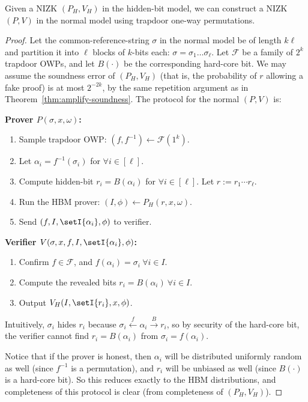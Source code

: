 \begin{theorem}\label{thm:NIZK-amplify}
    Given a NIZK $(P_H, V_H)$ in the hidden-bit model, we can construct a NIZK
    $(P, V)$ in the normal model using trapdoor one-way permutations.
\end{theorem}
\begin{proof}
    Let the common-reference-string $\sigma$ in the normal model be of length $k\ell$ and  partition it
    into $\ell$ blocks of $k$-bits each: $\sigma = \sigma_1\hdots\sigma_\ell$.
    Let $\mathcal{F}$ be a family of $2^k$ trapdoor OWPs, and let $B(\cdot)$
    be the corresponding hard-core bit. We may assume the soundness error
    of $(P_H, V_H)$
    (that is, the probability of $r$ allowing a fake proof)
    is at most $2^{-2k}$, by the same repetition argument as in Theorem~\ref{thm:amplify-soundness}.
    The protocol for the normal $(P, V)$ is:

\medskip
\noindent \textbf{Prover $P(\sigma, x, \omega)$:}
\begin{enumerate}
    \item Sample trapdoor OWP: $(f, f^{-1}) \gets \mathcal{F}(1^k)$.
    \item Let $\alpha_i = f^{-1}(\sigma_i)$ for $\forall i \in [\ell]$.
    \item Compute hidden-bit $r_i = B(\alpha_i)$ for $\forall i \in [\ell]$. Let $r := r_1 \cdots r_\ell$.
    \item Run the HBM prover: $(I, \phi) \gets P_H(r, x, \omega)$.
    \item Send $(f, I, \setI{\alpha_i}, \phi)$ to verifier.
\end{enumerate}

\noindent \textbf{Verifier $V(\sigma, x, f, I, \setI{\alpha_i}, \phi)$:}
\begin{enumerate}
    \item Confirm $f \in \mathcal{F}$, and $f(\alpha_i) = \sigma_i ~\forall i \in I$.
    \item Compute the revealed bits $r_i = B(\alpha_i) ~\forall i \in I$.
    \item Output $V_H(I, \setI{r_i}, x, \phi)$.
\end{enumerate}

Intuitively, $\sigma_i$ hides $r_i$ because $\sigma_i \overset{f}{\gets} \alpha_i
\overset{B}{\to} r_i$, so by security of the hard-core bit, the verifier cannot
find $r_i = B(\alpha_i)$ from $\sigma_i = f(\alpha_i)$.

Notice that if the prover is honest, then $\alpha_i$ will be distributed
uniformly random as well (since $f^{-1}$ is a permutation), and $r_i$ will be
unbiased as well (since $B(\cdot)$ is a hard-core bit). So this reduces exactly
to the HBM distributions, and completeness of this protocol is clear (from completeness of
$(P_H, V_H)$).


\end{proof}
